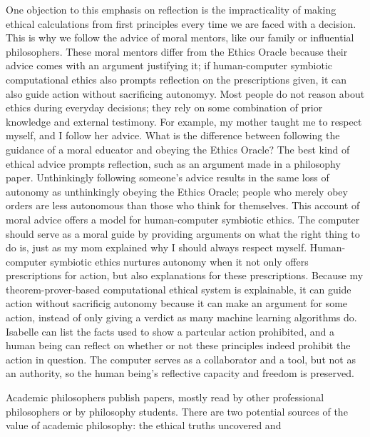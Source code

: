 \begin{isabellebody}
\begin{isamarkuptext}
One objection to this emphasis on reflection is the impracticality of making ethical calculations from first principles 
every time we are faced with a decision. This is why we follow the advice of moral mentors, like our 
family or influential philosophers. These moral mentors differ from the Ethics Oracle because their advice 
comes with an argument justifying it; if human-computer symbiotic computational ethics also prompts 
reflection on the prescriptions given, it can also guide action without sacrificing autonomyy.
Most people do not reason about ethics during everyday decisions; they rely on some combination of 
prior knowledge and external testimony. For example, my mother taught me to respect myself, and I 
follow her advice. What is the difference between following the guidance of a moral educator and 
obeying the Ethics Oracle? The best kind of ethical advice prompts reflection, such as an argument 
made in a philosophy paper. Unthinkingly following someone’s advice results in the same loss of 
autonomy as unthinkingly obeying the Ethics Oracle; people who merely obey orders are less autonomous 
than those who think for themselves. This account of moral advice offers a model for human-computer 
symbiotic ethics. The computer should serve as a moral guide by providing arguments on what the right 
thing to do is, just as my mom explained why I should always respect myself. Human-computer symbiotic 
ethics nurtures autonomy when it not only offers prescriptions for action, but also explanations for 
these prescriptions. Because my theorem-prover-based computational ethical system is explainable, it can 
guide action without sacrificig autonomy because it can make an argument for some action, instead of 
only giving a verdict as many machine learning algorithms do. Isabelle can list the facts used to show
a partcular action prohibited, and a human being can reflect on whether or not these principles
indeed prohibit the action in question. The computer serves as a collaborator and a tool, but not as an authority, 
so the human being’s reflective capacity and freedom is preserved.%
\end{isamarkuptext}\isamarkuptrue%
%
\isadelimdocument
%
\endisadelimdocument
%
\isatagdocument
%
\isamarkuptrue%
%
\endisatagdocument
{\isafolddocument}%
%
\isadelimdocument
%
\endisadelimdocument
%
\begin{isamarkuptext}%
Academic philosophers publish papers, mostly read by other professional philosophers or by philosophy students. 
There are two potential sources of the value of academic philosophy: the ethical truths uncovered and 

\end{isamarkuptext}
\end{isabellebody}
